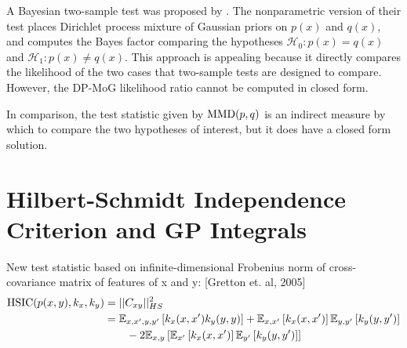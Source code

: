 \documentclass{article} %
\begin{document}
A Bayesian two-sample test was proposed by \cite{borgwardt2009bayesian}.  The nonparametric version of their test places Dirichlet process mixture of Gaussian priors on $p(x)$ and $q(x)$, and computes the Bayes factor comparing the hypotheses $\mathcal{H}_0 : p(x) = q(x)$ and  $\mathcal{H}_1 : p(x) \neq q(x)$.  This approach is appealing because it directly compares the likelihood of the two cases that two-sample tests are designed to compare.  However, the DP-MoG likelihood ratio cannot be computed in closed form.  

In comparison, the test statistic given by ${\rm MMD}(p,q)$ is an indirect measure by which to compare the two hypotheses of interest, but it does have a closed form solution.



\section{Hilbert-Schmidt Independence Criterion and GP Integrals}

New test statistic based on infinite-dimensional Frobenius norm of cross-covariance matrix of features of x and y: [Gretton et. al, 2005]
\begin{align}
{\rm HSIC}(p(x,y),k_x, k_y) & = || C_{xy} ||^2_{HS}  \\
& = \mathbb{E}_{x, x', y, y'} \left[ {k_x(x,x')k_y(y,y)} \right] + \mathbb{E}_{x, x'} \left[ {k_x(x,x')} \right]\mathbb{E}_{y, y'} \left[ {k_y(y,y')} \right] \\
\nonumber & \qquad - 2 \mathbb{E}_{x, y} \left[ {\mathbb{E}_{x'} \left[ {k_x(x,x')} \right]\mathbb{E}_{y'} \left[ {k_y(y,y')} \right]} \right]
\end{align}
\end{document}
